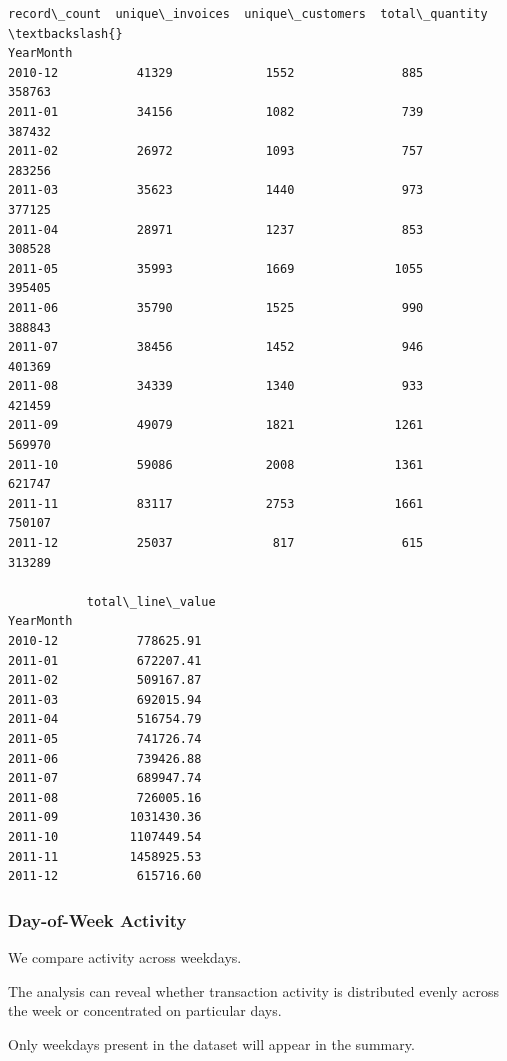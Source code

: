 \documentclass[11pt]{article}
\begin{document}
    
    \begin{Verbatim}[commandchars=\\\{\}]
           record\_count  unique\_invoices  unique\_customers  total\_quantity  \textbackslash{}
YearMonth                                                                    
2010-12           41329             1552               885          358763   
2011-01           34156             1082               739          387432   
2011-02           26972             1093               757          283256   
2011-03           35623             1440               973          377125   
2011-04           28971             1237               853          308528   
2011-05           35993             1669              1055          395405   
2011-06           35790             1525               990          388843   
2011-07           38456             1452               946          401369   
2011-08           34339             1340               933          421459   
2011-09           49079             1821              1261          569970   
2011-10           59086             2008              1361          621747   
2011-11           83117             2753              1661          750107   
2011-12           25037              817               615          313289   

           total\_line\_value  
YearMonth                    
2010-12           778625.91  
2011-01           672207.41  
2011-02           509167.87  
2011-03           692015.94  
2011-04           516754.79  
2011-05           741726.74  
2011-06           739426.88  
2011-07           689947.74  
2011-08           726005.16  
2011-09          1031430.36  
2011-10          1107449.54  
2011-11          1458925.53  
2011-12           615716.60  
    \end{Verbatim}

    
    \subsubsection{Day-of-Week Activity}\label{day-of-week-activity}

We compare activity across weekdays.

The analysis can reveal whether transaction activity is distributed
evenly across the week or concentrated on particular days.

Only weekdays present in the dataset will appear in the summary.
\end{document}

